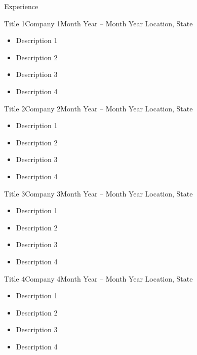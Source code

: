\documentclass[]{mcdowellcv}
\begin{document}
\makeheader

\begin{cvsection}{Experience}

    \begin{cvsubsection}{Title 1}{Company 1}{Month Year -- Month Year}
        Location, State
        \vspace{2.5mm}
        \begin{itemize}
            \item Description 1
            \item Description 2
            \item Description 3
            \item Description 4
        \end{itemize}
    \end{cvsubsection}
    
    \begin{cvsubsection}{Title 2}{Company 2}{Month Year -- Month Year}
        Location, State
        \vspace{2.5mm}
        \begin{itemize}
            \item Description 1
            \item Description 2
            \item Description 3
            \item Description 4
        \end{itemize}
    \end{cvsubsection}
    
    \begin{cvsubsection}{Title 3}{Company 3}{Month Year -- Month Year}
        Location, State
        \vspace{2.5mm}
        \begin{itemize}
            \item Description 1
            \item Description 2
            \item Description 3
            \item Description 4
        \end{itemize}
    \end{cvsubsection}
    
    \begin{cvsubsection}{Title 4}{Company 4}{Month Year -- Month Year}
        Location, State
        \vspace{2.5mm}
        \begin{itemize}
            \item Description 1
            \item Description 2
            \item Description 3
            \item Description 4
        \end{itemize}
    \end{cvsubsection}
    
\end{cvsection}
\end{document}
